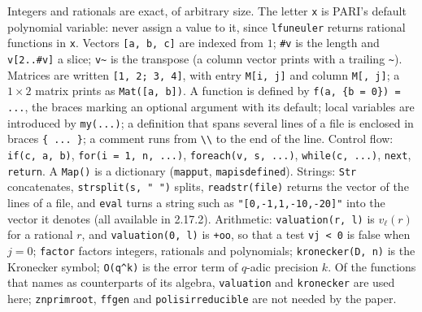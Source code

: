 \begin{sloppypar}
\begin{remark}\label{rem:computation:gp-language}
Integers and rationals are exact, of arbitrary size. The letter \texttt{x} is PARI's default polynomial variable: never assign a value to
it, since \texttt{lfuneuler} returns rational functions in \texttt{x}. Vectors \texttt{[a, b, c]} are indexed from $1$; \texttt{\#v} is the
length and \texttt{v[2..\#v]} a slice; \texttt{v\textasciitilde} is the transpose (a column vector prints with a trailing
\texttt{\textasciitilde}). Matrices are written \texttt{[1, 2; 3, 4]}, with entry \texttt{M[i, j]} and column \texttt{M[, j]}; a $1\times2$ matrix
prints as \texttt{Mat([a, b])}. A function is defined by \texttt{f(a, \{b = 0\}) = ...}, the braces marking an optional argument with its
default; local variables are introduced by \texttt{my(...)}; a definition that spans several lines of a file is enclosed in braces
\texttt{\{ ... \}}; a comment runs from \texttt{\textbackslash\textbackslash} to the end of the line. Control flow: \texttt{if(c, a, b)},
\texttt{for(i = 1, n, ...)}, \texttt{foreach(v, s, ...)}, \texttt{while(c, ...)}, \texttt{next}, \texttt{return}. A \texttt{Map()} is a
dictionary (\texttt{mapput}, \texttt{mapisdefined}). Strings: \texttt{Str} concatenates, \texttt{strsplit(s, " ")} splits,
\texttt{readstr(file)} returns the vector of the lines of a file, and \texttt{eval} turns a string such as \texttt{"[0,-1,1,-10,-20]"}
into the vector it denotes (all available in 2.17.2). Arithmetic: \texttt{valuation(r, l)} is $v_\ell(r)$ for a rational $r$, and
\texttt{valuation(0, l)} is \texttt{+oo}, so that a test \texttt{vj < 0} is false when $j=0$; \texttt{factor} factors integers, rationals
and polynomials; \texttt{kronecker(D, n)} is the Kronecker symbol; \texttt{O(q\^{}k)} is the error term of $q$-adic precision $k$. Of the
functions that  names as counterparts of its algebra, \texttt{valuation} and \texttt{kronecker} are used here;
\texttt{znprimroot}, \texttt{ffgen} and \texttt{polisirreducible} are not needed by the paper.
\end{remark}


\end{sloppypar}
